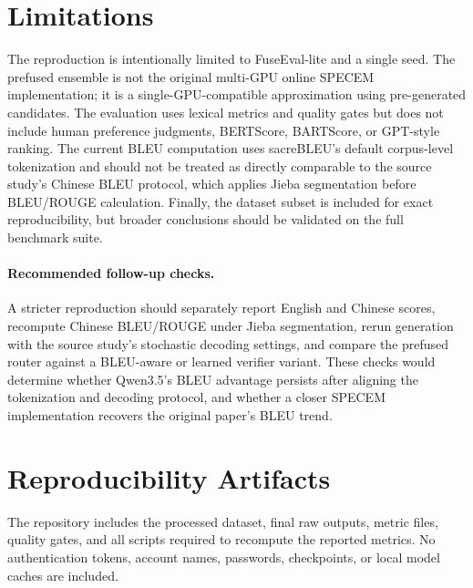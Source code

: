 \documentclass[11pt]{article}
\begin{document}
\section{Limitations}
The reproduction is intentionally limited to FuseEval-lite and a single seed. The prefused ensemble is not the original multi-GPU online SPECEM implementation; it is a single-GPU-compatible approximation using pre-generated candidates. The evaluation uses lexical metrics and quality gates but does not include human preference judgments, BERTScore, BARTScore, or GPT-style ranking. The current BLEU computation uses sacreBLEU's default corpus-level tokenization and should not be treated as directly comparable to the source study's Chinese BLEU protocol, which applies Jieba segmentation before BLEU/ROUGE calculation. Finally, the dataset subset is included for exact reproducibility, but broader conclusions should be validated on the full benchmark suite.

\paragraph{Recommended follow-up checks.} A stricter reproduction should separately report English and Chinese scores, recompute Chinese BLEU/ROUGE under Jieba segmentation, rerun generation with the source study's stochastic decoding settings, and compare the prefused router against a BLEU-aware or learned verifier variant. These checks would determine whether Qwen3.5's BLEU advantage persists after aligning the tokenization and decoding protocol, and whether a closer SPECEM implementation recovers the original paper's BLEU trend.

\section{Reproducibility Artifacts}
The repository includes the processed dataset, final raw outputs, metric files, quality gates, and all scripts required to recompute the reported metrics. No authentication tokens, account names, passwords, checkpoints, or local model caches are included.
\end{document}
